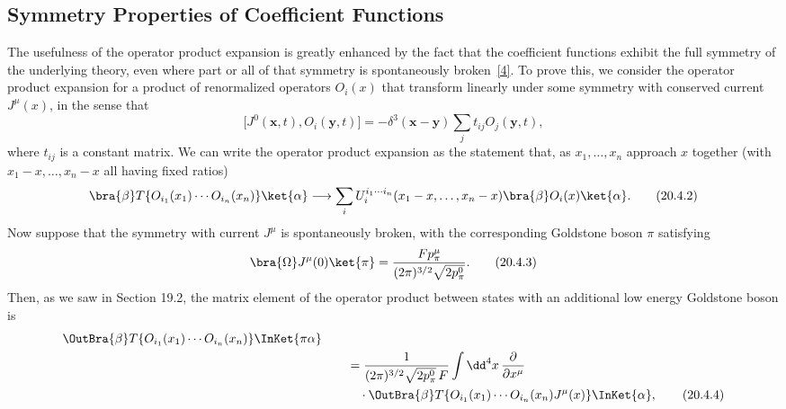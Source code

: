 
\subsection{Symmetry Properties of Coefficient Functions}

The usefulness of the operator product expansion is greatly enhanced by the fact that the coefficient functions exhibit the full symmetry of the underlying theory, even where part or all of that symmetry is spontaneously broken~\hyperref[ch20-ref-4]{[4]}. To prove this, we consider the operator product expansion for a product of renormalized operators $O_i(x)$ that transform linearly under some symmetry with conserved current $J^\mu(x)$, in the sense that
\begin{equation}
\bigl[J^0(\mathbf{x},t),O_i(\mathbf{y},t)\bigr]
=-\delta^3(\mathbf{x}-\mathbf{y})\sum_j t_{ij}O_j(\mathbf{y},t),
\tag{20.4.1}\label{eq:20.4.1}
\end{equation}
where $t_{ij}$ is a constant matrix. We can write the operator product expansion as the statement that, as $x_1,\ldots,x_n$ approach $x$ together (with $x_1-x,\ldots,x_n-x$ all having fixed ratios)
\begin{equation}
\bra{\beta}T\{O_{i_1}(x_1)\cdots O_{i_n}(x_n)\}\ket{\alpha}
\longrightarrow
\sum_i U_i^{i_1\cdots i_n}(x_1-x,\ldots,x_n-x)
\bra{\beta}O_i(x)\ket{\alpha}.
\tag{20.4.2}\label{eq:20.4.2}
\end{equation}
Now suppose that the symmetry with current $J^\mu$ is spontaneously broken, with the corresponding Goldstone boson $\pi$ satisfying
\begin{equation}
\bra{\Omega}J^\mu(0)\ket{\pi}
=\frac{Fp_\pi^\mu}{(2\pi)^{3/2}\sqrt{2p_\pi^0}}.
\tag{20.4.3}\label{eq:20.4.3}
\end{equation}
Then, as we saw in Section 19.2, the matrix element of the operator product between states with an additional low energy Goldstone boson is
\begin{align}
\OutBra{\beta}
T\{O_{i_1}(x_1)\cdots O_{i_n}(x_n)\}\InKet{\pi\alpha}
&\notag\\
&\qquad={}
\frac{1}{(2\pi)^{3/2}\sqrt{2p_\pi^0}\,F}
\int \dd^4x\,\frac{\partial}{\partial x^\mu}
\notag\\
&\qquad\quad{}\cdot\OutBra{\beta}
T\{O_{i_1}(x_1)\cdots O_{i_n}(x_n)J^\mu(x)\}
\InKet{\alpha},
\tag{20.4.4}\label{eq:20.4.4}
\end{align}
